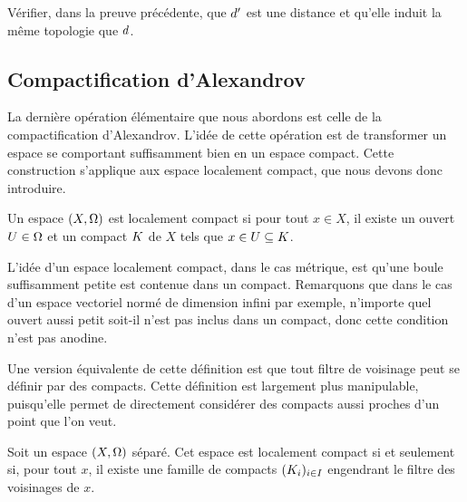 \begin{exercise}\label{exo.desc.verif1}
  Vérifier, dans la preuve précédente, que $d'$ est une distance et
  qu'elle induit la même topologie que $d$.
\end{exercise}

\subsection{Compactification d'Alexandrov}

La dernière opération élémentaire que nous abordons est celle de la
compactification d'Alexandrov. L'idée de cette opération est de transformer un
espace se comportant suffisamment bien en un espace compact. Cette construction
s'applique aux espace localement compact, que nous devons donc introduire.

\begin{definition}
  Un espace $(X,\Omega)$ est localement compact si pour tout $x\in X$, il existe
  un ouvert $U\in \Omega$ et un compact $K$ de $X$ tels que
  $x\in U\subseteq K$.
\end{definition}

L'idée d'un espace localement compact, dans le cas métrique, est qu'une boule
suffisamment petite est contenue dans un compact. Remarquons que dans le cas
d'un espace vectoriel normé de dimension infini par exemple, n'importe quel
ouvert aussi petit soit-il n'est pas inclus dans un compact, donc cette
condition n'est pas anodine.

Une version équivalente de cette définition est que tout filtre de voisinage
peut se définir par des compacts. Cette définition est largement plus
manipulable, puisqu'elle permet de directement considérer des compacts aussi
proches d'un point que l'on veut.

\begin{proposition}\label{prop.carac.compac.loc}
  Soit un espace $(X,\Omega)$ séparé. Cet espace est localement compact si et
  seulement si, pour tout $x$, il existe une famille de compacts
  $(K_i)_{i \in I}$ engendrant le filtre des voisinages de $x$.
\end{proposition}

